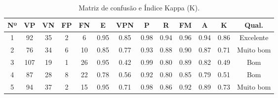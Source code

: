 \begin{table}[ht]
  \caption{Matriz de confusão e Índice Kappa (K).}
  \label{tab:matrix_result}
  \begin{center}
    \begin{tabular}{c|cccc|cccccc|cc}
    \toprule
    \textbf{Nº} & \textbf{VP} & \textbf{VN} & \textbf{FP} & \textbf{FN} & \textbf{E} & \textbf{VPN} & \textbf{P} & \textbf{R} & \textbf{FM} & \textbf{A} & \textbf{K} & \textbf{Qual.} \\
    \midrule
      1 & 92 & 35 & 2 & 6 & 0.95 & 0.85 & 0.98 & 0.94 & 0.96 & 0.94 & 0.86 & Excelente\\
      2 & 76 & 34 & 6 & 10 & 0.85 & 0.77 & 0.93 & 0.88 & 0.90 & 0.87 & 0.71 & Muito bom\\
      3 & 107 & 19 & 1 & 26 & 0.95 & 0.42 & 0.99 & 0.80 & 0.89 & 0.82 & 0.49 & Bom \\
      4 & 87 & 28 & 8 & 22 & 0.78 & 0.56 & 0.92 & 0.80 & 0.85 & 0.79 & 0.51 & Bom \\
      5 & 94 & 37 & 2 & 15 & 0.95 & 0.71 & 0.98 & 0.86 & 0.92 & 0.89 & 0.73 & Muito bom\\
    \bottomrule
    \end{tabular}
  \end{center}
\end{table}

